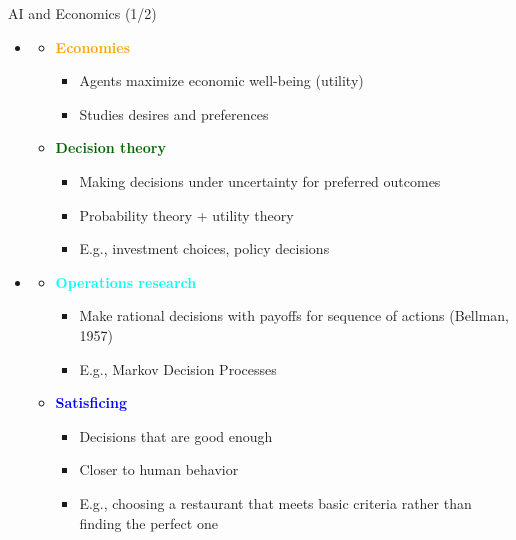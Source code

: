 \documentclass[
  10pt,
  ignorenonframetext,
]{beamer}
\providecommand{\tightlist}{%
  \setlength{\itemsep}{0pt}\setlength{\parskip}{0pt}}
\begin{document}
\begin{frame}{AI and Economics (1/2)}
\label{ai-and-economics-12}
\begin{itemize}
\tightlist
\item
  \textbf{\textcolor{red}{\textcolor{black}{}}}

  \begin{itemize}
  \tightlist
  \item
    \textbf{\textcolor{orange}{Economies}}

    \begin{itemize}
    \tightlist
    \item
      Agents maximize economic well-being (utility)
    \item
      Studies desires and preferences
    \end{itemize}
  \item
    \textbf{\textcolor{darkgreen}{Decision theory}}

    \begin{itemize}
    \tightlist
    \item
      Making decisions under uncertainty for preferred outcomes
    \item
      Probability theory + utility theory
    \item
      E.g., investment choices, policy decisions
    \end{itemize}
  \end{itemize}
\item
  \textbf{\textcolor{teal}{\textcolor{black}{}}}

  \begin{itemize}
  \tightlist
  \item
    \textbf{\textcolor{cyan}{Operations research}}

    \begin{itemize}
    \tightlist
    \item
      Make rational decisions with payoffs for sequence of actions
      (Bellman, 1957)
    \item
      E.g., Markov Decision Processes
    \end{itemize}
  \item
    \textbf{\textcolor{blue}{Satisficing}}

    \begin{itemize}
    \tightlist
    \item
      Decisions that are good enough
    \item
      Closer to human behavior
    \item
      E.g., choosing a restaurant that meets basic criteria rather than
      finding the perfect one
    \end{itemize}
  \end{itemize}
\end{itemize}
\end{frame}
\end{document}

